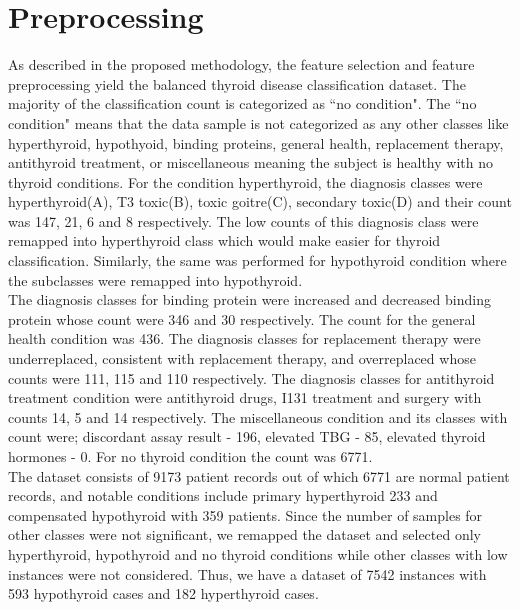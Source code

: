\section{Preprocessing}
As described in the proposed methodology, the feature selection and feature preprocessing yield the balanced thyroid disease classification dataset. The majority of the classification count is categorized as ``no condition". The ``no condition" means that the data sample is not categorized as any other classes like hyperthyroid, hypothyoid, binding proteins, general health, replacement therapy, antithyroid treatment, or miscellaneous meaning the subject is healthy with no thyroid conditions.
For the condition hyperthyroid, the diagnosis classes were hyperthyroid(A), T3 toxic(B), toxic goitre(C), secondary toxic(D) and their count was 147, 21, 6 and 8 respectively. The low counts of this diagnosis class were remapped into hyperthyroid class which would make easier for thyroid classification. Similarly, the same was performed for hypothyroid condition where the subclasses were remapped into hypothyroid.\\
The diagnosis classes for binding protein were increased and decreased binding protein whose count were 346 and 30 respectively. The count for the general health condition was 436. The diagnosis classes for replacement therapy were underreplaced, consistent with replacement therapy, and overreplaced whose counts were 111, 115 and 110 respectively. The diagnosis classes for antithyroid treatment condition were antithyroid drugs, I131 treatment and surgery with counts 14, 5 and 14 respectively. The miscellaneous condition and its classes with count were; discordant assay result - 196, elevated TBG - 85, elevated thyroid hormones - 0. For no thyroid condition the count was 6771.\\
The dataset consists of 9173 patient records out of which 6771 are normal patient records, and notable conditions include primary hyperthyroid 233 and compensated hypothyroid with 359 patients. Since the number of samples for other classes were not significant, we remapped the dataset and selected only hyperthyroid, hypothyroid and no thyroid conditions while other classes with low instances were not considered. Thus, we have a dataset of 7542 instances with 593 hypothyroid cases and 182 hyperthyroid cases.

